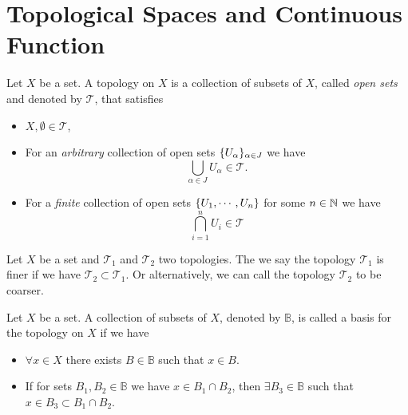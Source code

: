 \chapter{Topological Spaces and Continuous Function}

\begin{definition}
	Let $ X $ be a set. A topology on $ X $ is a collection of subsets of $ X $, called \emph{open sets} and denoted by $ \mathcal{T} $, that satisfies
	\begin{itemize}[noitemsep]
		\item $ X,\emptyset \in \mathcal{T} $,
		\item For an \emph{arbitrary} collection of open sets $ \{U_\alpha\}_{\alpha \in J} $ we have
		\[ \bigcup_{\alpha\in J} U_\alpha \in \mathcal{T}. \]
		\item For a \emph{finite} collection of open sets $ \{U_1,\cdots,U_n\} $ for some $ n\in \mathbb{N} $ we have
		\[ \bigcap_{i=1}^n U_i \in \mathcal{T} \]
	\end{itemize}
\end{definition}

\begin{definition}
	Let $ X $ be a set and $ \mathcal{T}_1 $ and $ \mathcal{T}_2 $ two topologies. The we say the topology $ \mathcal{T}_1 $ is finer if we have $ \mathcal{T_2} \subset \mathcal{T_1} $. Or alternatively, we can call the topology $ \mathcal{T}_2 $ to be coarser.
\end{definition}

\begin{definition}
	Let $ X $ be a set. A collection of subsets of $ X $, denoted by $ \mathbb{B} $, is called a basis for the topology on $ X $ if we have
	\begin{itemize}[noitemsep]
		\item $ \forall x \in X $ there exists $ B \in \mathbb{B} $ such that $ x \in B $.
		\item If for sets $ B_1,B_2 \in \mathbb{B} $ we have $ x \in B_1\cap B_2 $, then $ \exists B_3 \in \mathbb{B} $ such that $ x \in B_3 \subset B_1\cap B_2 $.
	\end{itemize}
\end{definition}

